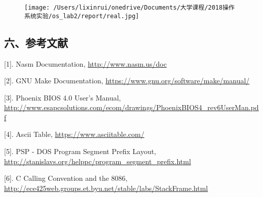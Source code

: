 \documentclass[ctexart]{article}
\begin{document}
\begin{figure}
\centering
\texttt{[image: /Users/lixinrui/onedrive/Documents/大学课程/2018操作系统实验/os\_lab2/report/real.jpg]}
\caption{}
\end{figure}

\hypertarget{header-n246}{%
\subsection{六、参考文献}\label{header-n246}}

{[}1{]}. Nasm Documentation, \url{http://www.nasm.us/doc}

{[}2{]}. GNU Make Documentation,
\url{https://www.gnu.org/software/make/manual/}

{[}3{]}. Phoenix BIOS 4.0 User's Manual,
\url{http://www.esapcsolutions.com/ecom/drawings/PhoenixBIOS4_rev6UserMan.pdf}

{[}4{]}. Ascii Table, \url{https://www.asciitable.com/}

{[}5{]}. PSP - DOS Program Segment Prefix Layout,
\url{http://stanislavs.org/helppc/program_segment_prefix.html}

{[}6{]}. C Calling Convention and the 8086,
\url{http://ece425web.groups.et.byu.net/stable/labs/StackFrame.html}
\end{document}
